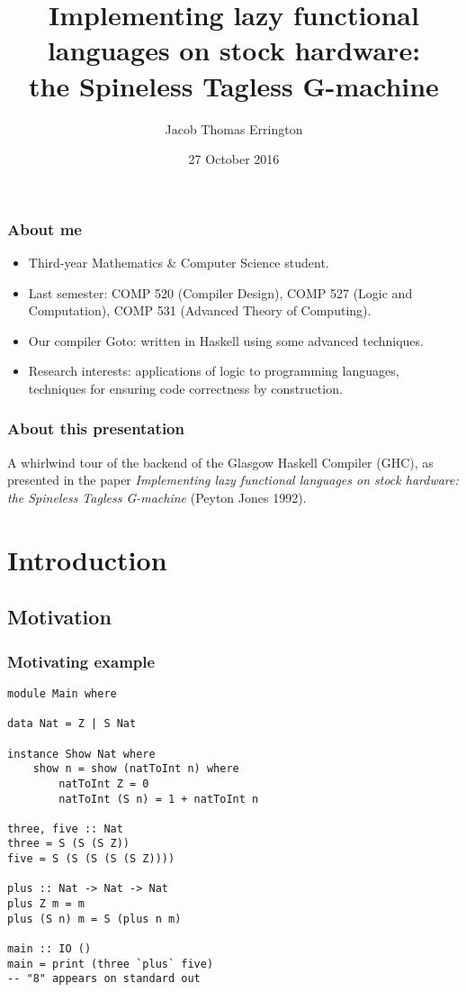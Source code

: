 \documentclass{beamer}
\author{Jacob Thomas Errington}
\title{
    Implementing lazy functional languages on stock hardware:\\
    the Spineless Tagless G-machine
}
\institute{McGill University}
\date{27 October 2016}
\begin{document}
\frame{\titlepage}

\begin{frame}
    \frametitle{About me}

    \begin{itemize}
        \item Third-year Mathematics \& Computer Science student.
        \item Last semester:
            COMP 520 (Compiler Design),
            COMP 527 (Logic and Computation),
            COMP 531 (Advanced Theory of Computing).
        \item Our compiler Goto: written in Haskell using some advanced
            techniques.
        \item Research interests: applications of logic to programming
            languages, techniques for ensuring code correctness by
            construction.
    \end{itemize}
\end{frame}

\begin{frame}
    \frametitle{About this presentation}

    A whirlwind tour of the backend of the Glasgow Haskell Compiler (GHC), as
    presented in the paper \emph{Implementing lazy functional languages on
    stock hardware: the Spineless Tagless G-machine} (Peyton Jones 1992).

    \tableofcontents
\end{frame}

\section{Introduction}

\subsection{Motivation}

\begin{frame}
    \frametitle{Motivating example}

    \begin{lstlisting}
module Main where

data Nat = Z | S Nat

instance Show Nat where
    show n = show (natToInt n) where
        natToInt Z = 0
        natToInt (S n) = 1 + natToInt n

three, five :: Nat
three = S (S (S Z))
five = S (S (S (S (S Z))))

plus :: Nat -> Nat -> Nat
plus Z m = m
plus (S n) m = S (plus n m)

main :: IO ()
main = print (three `plus` five)
-- "8" appears on standard out
    \end{lstlisting}
\end{frame}
\end{document}
